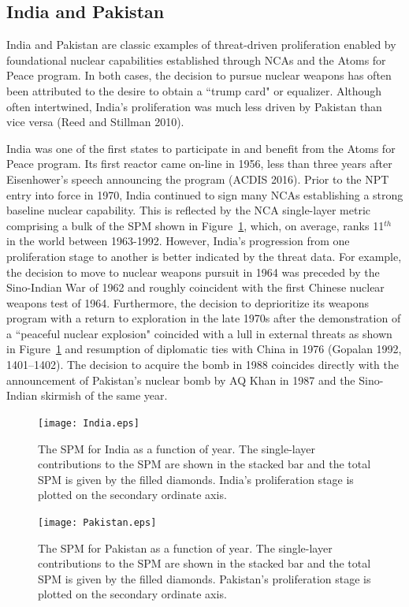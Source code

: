 \documentclass{article} %
\begin{document}
{\subsection*{India and Pakistan}

India and Pakistan are classic examples of threat-driven proliferation enabled by foundational nuclear capabilities established through NCAs and the Atoms for Peace program. In both cases, the decision to pursue nuclear weapons has often been attributed to the desire to obtain a ``trump card" or equalizer. Although often intertwined, India's proliferation was much less driven by Pakistan than vice versa (Reed and Stillman 2010).  

India was one of the first states to participate in and benefit from the Atoms for Peace program. Its first reactor came on-line in 1956, less than three years after Eisenhower's speech announcing the program (ACDIS 2016). Prior to the NPT entry into force in 1970, India continued to sign many NCAs establishing a strong baseline nuclear capability. This is reflected by the NCA single-layer metric comprising a bulk of the SPM shown in Figure~\ref{fig:india}, which, on average, ranks 11$^{th}$ in the world between 1963-1992. However, India's progression from one proliferation stage to another is better indicated by the threat data. For example, the decision to move to nuclear weapons pursuit in 1964 was preceded by the Sino-Indian War of 1962 and  roughly coincident with the first Chinese nuclear weapons test of 1964. Furthermore, the decision to deprioritize its weapons program with a return to exploration in the late 1970s after the demonstration of a ``peaceful nuclear explosion" coincided with a lull in external threats as shown in Figure~\ref{fig:india} and resumption of diplomatic ties with China in 1976 (Gopalan 1992, 1401--1402). The decision to acquire the bomb in 1988 coincides directly with the announcement of Pakistan's nuclear bomb by AQ Khan in 1987 and the Sino-Indian skirmish of the same year.  

\begin{figure}
  \centering
  \texttt{[image: India.eps]}
  \caption{The SPM for India as a function of year. The single-layer contributions to the SPM are shown in the stacked bar and the total SPM is given by the filled diamonds. India's proliferation stage is plotted on the secondary ordinate axis.}
  \label{fig:india}
\end{figure}

\begin{figure}
  \centering
  \texttt{[image: Pakistan.eps]}
  \caption{The SPM for Pakistan as a function of year. The single-layer contributions to the SPM are shown in the stacked bar and the total SPM is given by the filled diamonds. Pakistan's proliferation stage is plotted on the secondary ordinate axis.}
  \label{fig:pakistan}
\end{figure}

}
\end{document}
